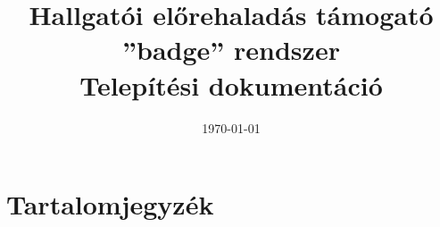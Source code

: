 \documentclass[a4paper,10pt,titlepage]{article}
\newcommand{\szerzo}{}
\newcommand{\cim}{Hallgatói előrehaladás támogató ''badge'' rendszer \\ Telepítési dokumentáció}
\begin{document}


\begin{titlepage}

\title{\cim}
\author{\szerzo}
\date{\today}

\end{titlepage}
\maketitle

\section*{Tartalomjegyzék}
\makeatletter
{}
\makeatother

\newpage
\end{document}

